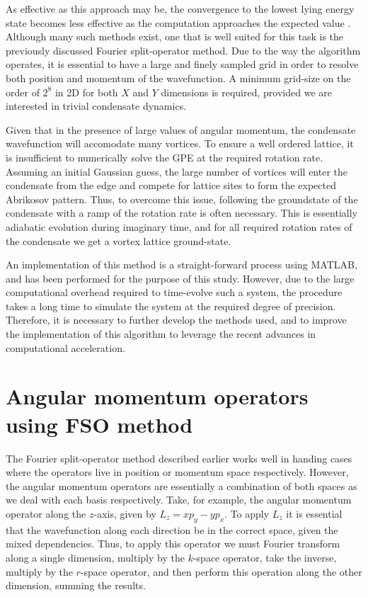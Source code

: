 As effective as this approach may be, the convergence to the lowest lying energy state becomes less effective as the computation approaches the expected value \cite{Vtx:Danaila_pra_2005}. Although many such methods exist, one that is well suited for this task is the previously discussed Fourier split-operator method. Due to the way the algorithm operates, it is essential to have a large and finely sampled grid in order to resolve both position and momentum of the wavefunction. A minimum grid-size on the order of $2^8$ in 2D for both $X$ and $Y$ dimensions is required, provided we are interested in trivial condensate dynamics.

Given that in the presence of large values of angular momentum, the condensate wavefunction will accomodate many vortices. To ensure a well ordered lattice, it is insufficient to numerically solve the GPE at the required rotation rate. Assuming an initial Gaussian guess, the large number of vortices will enter the condensate from the edge and compete for lattice sites to form the expected Abrikosov pattern. Thus, to overcome this issue, following the groundstate of the condensate with a ramp of the rotation rate is often necessary. This is essentially adiabatic evolution during imaginary time, and for all required rotation rates of the condensate we get a vortex lattice ground-state.

An implementation of this method is a straight-forward process using MATLAB, and has been performed for the purpose of this study. However, due to the large computational overhead required to time-evolve such a system, the procedure takes a long time to simulate the system at the required degree of precision. Therefore, it is necessary to further develop the methods used, and to improve the implementation of this algorithm to leverage the recent advances in computational acceleration.

\section{Angular momentum operators using FSO method}
The Fourier split-operator method described earlier works well in handing cases where the operators live in position or momentum space respectively. However, the angular momentum operators are essentially a combination of both spaces as we deal with each basis respectively. Take, for example, the angular momentum operator along the $z$-axis, given by $L_z = xp_y - yp_x$. To apply $L_z$ it is essential that the wavefunction along each direction be in the correct space, given the mixed dependencies. Thus, to apply this operator we must Fourier transform along a single dimension, multiply by the $k$-space operator, take the inverse, multiply by the $r$-space operator, and then perform this operation along the other dimension, summing the results.


